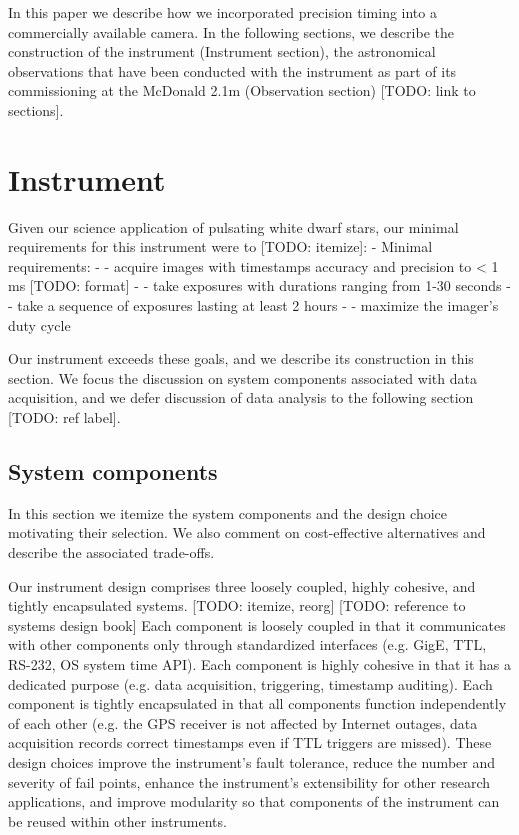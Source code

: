 \documentclass[preprint2]{aastex}
\begin{document}
In this paper we describe how we incorporated precision timing into a commercially available camera. In the following sections, we describe the construction of the instrument (Instrument section), the astronomical observations that have been conducted with the instrument as part of its commissioning at the McDonald 2.1m (Observation section) [TODO: link to sections].

\section{Instrument}

Given our science application of pulsating white dwarf stars, our minimal requirements for this instrument were to [TODO: itemize]:
- Minimal requirements:
- - acquire images with timestamps accuracy and precision to  < 1 ms [TODO: format]
- - take exposures with durations ranging from 1-30 seconds
- - take a sequence of exposures lasting at least 2 hours
- - maximize the imager's duty cycle

Our instrument exceeds these goals, and we describe its construction in this section. We focus the discussion on system components associated with data acquisition, and we defer discussion of data analysis to the following section [TODO: ref label].

\subsection{System components}

In this section we itemize the system components and the design choice motivating their selection. We also comment on cost-effective alternatives and describe the associated trade-offs.

Our instrument design comprises three loosely coupled, highly cohesive, and tightly encapsulated systems. [TODO: itemize, reorg] [TODO: reference to systems design book] Each component is loosely coupled in that it communicates with other components only through standardized interfaces (e.g. GigE, TTL, RS-232, OS system time API). Each component is highly cohesive in that it has a dedicated purpose (e.g. data acquisition, triggering, timestamp auditing). Each component is tightly encapsulated in that all components function independently of each other (e.g. the GPS receiver is not affected by Internet outages, data acquisition records correct timestamps even if TTL triggers are missed).  These design choices improve the instrument's fault tolerance, reduce the number and severity of fail points, enhance the instrument's extensibility for other research applications, and improve modularity so that components of the instrument can be reused within other instruments.
\end{document}
